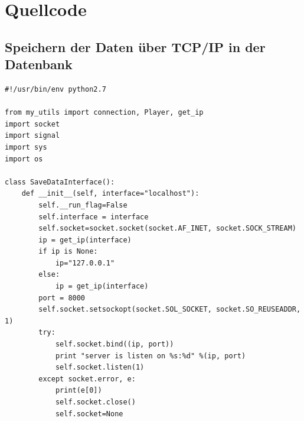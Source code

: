\chapter{Quellcode}
\label{quellcode}

\section{Speichern der Daten über \ac{TCP/IP} in der Datenbank}
\label{save_data_tcp_code_gru}

\begin{lstlisting}
#!/usr/bin/env python2.7

from my_utils import connection, Player, get_ip
import socket
import signal
import sys
import os

class SaveDataInterface():
    def __init__(self, interface="localhost"):
        self.__run_flag=False
        self.interface = interface
        self.socket=socket.socket(socket.AF_INET, socket.SOCK_STREAM)
        ip = get_ip(interface)
        if ip is None:
            ip="127.0.0.1"
        else:
            ip = get_ip(interface)
        port = 8000
        self.socket.setsockopt(socket.SOL_SOCKET, socket.SO_REUSEADDR, 1)
        try:
            self.socket.bind((ip, port))
            print "server is listen on %s:%d" %(ip, port)
            self.socket.listen(1)
        except socket.error, e:
            print(e[0])
            self.socket.close()
            self.socket=None


\end{lstlisting}
